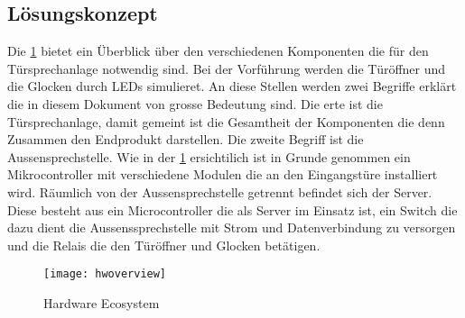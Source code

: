 \subsection{Lösungskonzept}
\label{sec:lösungskonzept}
Die \cref{fig:hwoverview} bietet ein Überblick über den verschiedenen Komponenten die für den Türsprechanlage notwendig sind. Bei der Vorführung werden die Türöffner und die Glocken durch LEDs simulieret. 
An diese Stellen werden zwei Begriffe erklärt die in diesem Dokument von grosse Bedeutung sind. Die erte ist die Türsprechanlage, damit gemeint ist die Gesamtheit der Komponenten die denn Zusammen den Endprodukt darstellen.
Die zweite Begriff ist die Aussensprechstelle. Wie in der \cref{fig:hwoverview} ersichtilich ist in Grunde genommen ein Mikrocontroller mit verschiedene Modulen die an den Eingangstüre installiert wird. Räumlich von der Aussensprechstelle getrennt befindet sich der Server. Diese besteht aus ein Microcontroller die als Server im Einsatz ist, ein Switch die dazu dient die Aussenssprechstelle mit Strom und Datenverbindung zu versorgen und die Relais die den Türöffner und Glocken betätigen.

\begin{figure}[htb!]
	\begin{center}
		\texttt{[image: hwoverview]}
		\caption[Hardware Ecosystem]{Hardware Ecosystem}
		\label{fig:hwoverview}
	\end{center}
\end{figure}
 
\newpage
